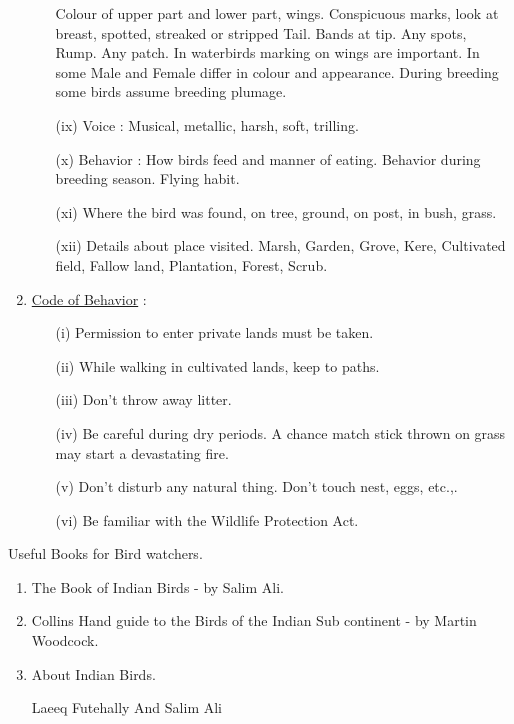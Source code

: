 \begin{enumerate}
\begin{itemize}
Colour of upper part and lower part, wings. Conspicuous 
marks, look at breast, spotted, streaked or stripped 
Tail. Bands at tip. Any spots, Rump. Any patch. 
In waterbirds marking on wings are important. In some 
Male and Female differ in colour and appearance. During 
breeding some birds assume breeding plumage. 

\item[(ix)] Voice : Musical, metallic, harsh, soft, trilling. 

\item[(x)] Behavior : How birds feed and manner of eating. Behavior 
during breeding season. Flying habit. 

\item[(xi)] Where the bird was found, on tree, ground, on post, in 
bush, grass. 

\item[(xii)] Details about place visited. Marsh, Garden, Grove, 
Kere, Cultivated field, Fallow land, Plantation, Forest, 
Scrub. 
\end{itemize}

\item \underline{Code of Behavior} : 
\begin{itemize}
\item[(i)] Permission to enter private lands must be taken. 

\item[(ii)] While walking in cultivated lands, keep to paths. 

\item[(iii)] Don't throw away litter. 

\item[(iv)] Be careful during dry periods. A chance match stick 
thrown on grass may start a devastating fire. 

\item[(v)] Don't disturb any natural thing. Don't touch nest, eggs, 
etc.,.

\item[(vi)] Be familiar with the Wildlife Protection Act. 
\end{itemize}
\end{enumerate}

Useful Books for Bird watchers. 
\begin{enumerate}
\item The Book of Indian Birds - by Salim Ali. 

\item Collins Hand guide to the Birds of the Indian Sub continent - by Martin Woodcock. 

\item About Indian Birds. 

Laeeq Futehally And Salim Ali 
\end{enumerate}

